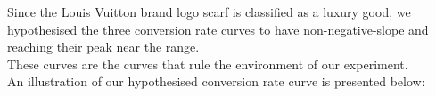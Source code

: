 Since the Louis Vuitton brand logo scarf is classified as a luxury good, we hypothesised the three conversion rate curves to have non-negative-slope and reaching their peak near the  range. \\These curves are the curves that rule the environment of our experiment.\\An illustration of our hypothesised conversion rate curve is presented below:\newline
{} 
\clearpage